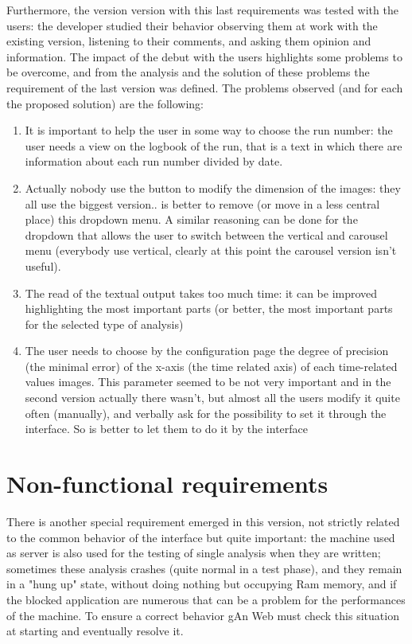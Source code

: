 Furthermore, the version version with this last requirements was tested with the users: the developer studied their behavior observing them at work with the existing version, listening to their comments, and asking them opinion and information. The impact  of the debut with the users highlights some problems to be overcome, and from the analysis and the solution of these problems the requirement of the last version was defined. The problems observed (and for each the proposed solution) are the following:

\begin{enumerate}
\item 
It is important to help the user in some way to choose the run number: the user needs a view on the logbook of the run, that is a text in which there are information about each run number divided by date.

\item
Actually nobody use the button to modify the dimension of the images: they all use the biggest version.. is better to remove (or move in a less central place) this dropdown menu. A similar reasoning can be done for the dropdown that allows the user to switch between the vertical and carousel menu (everybody use vertical, clearly at this point the carousel version isn't useful).

\item
The read of the textual output takes too much time: it can be improved highlighting the most important parts (or better, the most important parts for the selected type of analysis)

\item
The user needs to choose by the configuration page the degree of precision (the minimal error) of the x-axis (the time related axis) of each time-related values images. This parameter seemed to be not very important and in the second version actually there wasn't, but almost all the users modify it quite often (manually), and verbally ask for the possibility to set it through the interface. So is better to let them to do it by the interface

\end{enumerate}

\section{Non-functional requirements}

There is another special requirement emerged in this version, not strictly related to the common behavior of the interface but quite important: the machine  used as server is also used for the testing of single analysis when they are written; sometimes these analysis crashes (quite normal in a test phase), and they remain in a "hung up" state, without doing nothing but occupying Ram memory, and if the blocked application are numerous that can be a problem for the performances of the machine. To ensure a correct behavior gAn Web must check this situation at starting and eventually resolve it.

